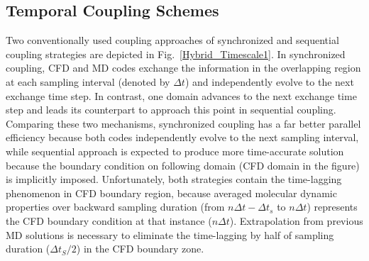 \documentclass[preprint,12pt]{elsarticle}
\begin{document}
\subsection{Temporal Coupling Schemes}
\label{sec:numerical_temporal}


Two conventionally used coupling approaches of synchronized and sequential coupling strategies are depicted in Fig.~\ref{Hybrid_Timescale1}. In synchronized coupling, CFD and MD codes exchange the information in the overlapping region at each sampling interval (denoted by ${\Delta}t$) and independently evolve to the next exchange time step. In contrast, one domain advances to the next exchange time step and leads its counterpart to approach this point in sequential coupling. Comparing these two mechanisms, synchronized coupling has a far better parallel efficiency because both codes independently evolve to the next sampling interval, while sequential approach is expected to produce more time-accurate solution because the boundary condition on following domain (CFD domain in the figure) is implicitly imposed. Unfortunately, both strategies contain the time-lagging phenomenon in CFD boundary region, because averaged molecular dynamic properties over backward sampling duration (from $n{\Delta}t-{\Delta}t_{s}$ to $n{\Delta}t$) represents the CFD boundary condition at that instance ($n{\Delta}t$). Extrapolation from previous MD solutions is necessary to eliminate the time-lagging by half of sampling duration (${\Delta}t_{S}/{2}$) in the CFD boundary zone.
\end{document}
